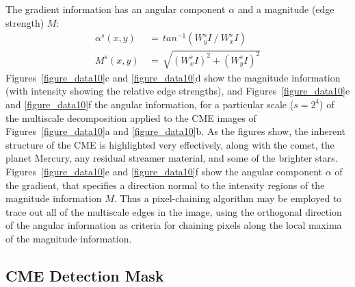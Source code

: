 \documentclass[preprint2]{aastex}
\begin{document}
The gradient information has an angular component $\alpha$ and a magnitude (edge strength) $M$:
\begin{eqnarray}
\alpha^s(x,y) \, &= \, tan^{-1}\left( W_{y}^s I~/~W_{x}^s I \right) \\
M^s(x,y) \, &= \, \sqrt{ ( W_{x}^s I ) ^2 + ( W_{y}^s I ) ^2 }
\end{eqnarray}
Figures~\ref{figure_data10}c and \ref{figure_data10}d show the magnitude information (with intensity showing the relative edge strengths), and Figures~\ref{figure_data10}e and \ref{figure_data10}f the angular information, for a particular scale ($s=2^{4}$) of the multiscale decomposition applied to the CME images of Figures~\ref{figure_data10}a and \ref{figure_data10}b. As the figures show, the inherent structure of the CME is highlighted very effectively, along with the comet, the planet Mercury, any residual streamer material, and some of the brighter stars. Figures~\ref{figure_data10}e and \ref{figure_data10}f show the angular component $\alpha$ of the gradient, that specifies a direction normal to the intensity regions of the magnitude information $M$. Thus a pixel-chaining algorithm may be employed to trace out all of the multiscale edges in the image, using the orthogonal direction of the angular information as criteria for chaining pixels along the local maxima of the magnitude information.


\subsection{CME Detection Mask}
\label{sect_detectionmask}
\end{document}
